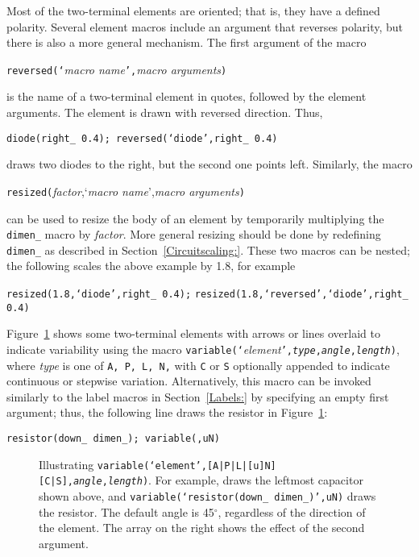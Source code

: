 Most of the two-terminal elements are oriented; that is, they have
a defined polarity.  Several element macros include an argument
that reverses polarity, but there is also a more general mechanism.
The first argument of the macro

{\tt reversed(`}{\sl macro name}{\tt',}{\sl macro arguments}{\tt )}

\noindent
is the name of a two-terminal element in quotes, followed by the
element arguments.  The element is drawn with reversed direction.
Thus,

{\tt diode(right\_ 0.4); reversed(`diode',right\_ 0.4)}

\noindent
draws two diodes to the right, but the second one points left.
Similarly, the macro

{\tt resized(}{\sl factor},`{\sl macro name}',{\sl macro arguments}{\tt )}

\noindent
can be used to resize the body of an element by temporarily multiplying
the {\tt dimen\_} macro by {\sl factor}. More general resizing should be
done by redefining {\tt dimen\_} as described in Section~\ref{Circuitscaling:}.
These two macros can be nested; the following scales the above example
by 1.8, for example

{\tt resized(1.8,`diode',right\_ 0.4);}
{\tt resized(1.8,`reversed',`diode',right\_ 0.4)}

Figure~\ref{Variable} shows some two-terminal elements with
arrows or lines overlaid to indicate variability using the macro
{\tt variable(`}{\sl element}{\tt',{\sl type},{\sl angle},{\sl length})},
where {\sl type} is one of {\tt A, P, L, N,} with {\tt C} or {\tt S}
optionally appended to indicate continuous or stepwise variation.
Alternatively, this macro
can be invoked similarly to the label macros in
Section~\ref{Labels:} by specifying an empty first argument;
thus, the following line draws the resistor in Figure~\ref{Variable}:

   {\tt resistor(down\_ dimen\_); variable(,uN)}

\begin{figure}[h!t]
\vspace*{-\baselineskip}
   
   \caption{Illustrating
   {\tt variable(`{\sl element}',[A|P|L|[u]N][C|S],{\sl angle},{\sl length})}.
   For example, draws
   the leftmost capacitor shown above, and {\tt variable(`resistor(down\_
   dimen\_)',uN)} draws the resistor.  The default angle is
   45${}^{\circ}$, regardless of the direction of the element.  The array
   on the right shows the effect of the second argument.}
   \label{Variable}
   \end{figure}

